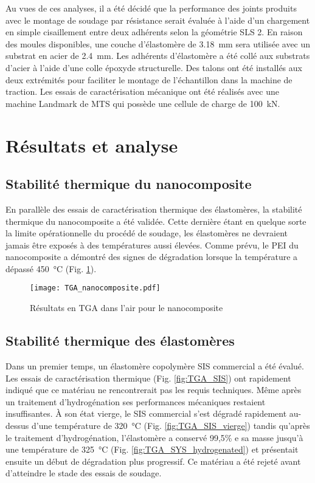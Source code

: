 Au vues de ces analyses, il a été décidé que la performance des joints produits avec le montage de soudage par résistance serait évaluée à l'aide d'un chargement en simple cisaillement entre deux adhérents selon la géométrie SLS 2. 
En raison des moules disponibles, une couche d'élastomère de \SI{3.18}{\milli\metre} sera utilisée avec un substrat en acier de \SI{2.4}{\milli\metre}. 
Les adhérents d'élastomère a été collé aux substrats d'acier à l'aide d'une colle époxyde structurelle. 
Des talons ont été installés aux deux extrémités pour faciliter le montage de l'échantillon dans la machine de traction. 
Les essais de caractérisation mécanique ont été réalisés avec une machine Landmark de MTS qui possède une cellule de charge de \SI{100}{\kilo\newton}. 

\FloatBarrier
\section{Résultats et analyse}

\subsection{Stabilité thermique du nanocomposite}

En parallèle des essais de caractérisation thermique des élastomères, la stabilité thermique du nanocomposite a été validée. 
Cette dernière étant en quelque sorte la limite opérationnelle du procédé de soudage, les élastomères ne devraient jamais être exposés à des températures aussi élevées. 
Comme prévu, le PEI du nanocomposite a démontré des signes de dégradation lorsque la température a dépassé \SI{450}{\celsius} (Fig. \ref{fig:TGA_nanocomposite}). 

\begin{figure}[htb]
	\centering
	\texttt{[image: TGA\_nanocomposite.pdf]}
	\caption{Résultats en TGA dans l'air pour le nanocomposite}
	\label{fig:TGA_nanocomposite}
\end{figure}

\FloatBarrier
\subsection{Stabilité thermique des élastomères}

Dans un premier temps, un élastomère copolymère SIS commercial a été évalué. 
Les essais de caractérisation thermique (Fig. \ref{fig:TGA_SIS}) ont rapidement indiqué que ce matériau ne rencontrerait pas les requis techniques. 
Même après un traitement d'hydrogénation ses performances mécaniques restaient insuffisantes. 
À son état vierge, le SIS commercial s'est dégradé rapidement au-dessus d'une température de \SI{320}{\celsius} (Fig. \ref{fig:TGA_SIS_vierge}) tandis qu'après le traitement d'hydrogénation, l'élastomère a conservé 99,5\% e sa masse jusqu'à une température de \SI{325}{\celsius} (Fig. \ref{fig:TGA_SYS_hydrogenated}) et présentait ensuite un début de dégradation plus progressif.  
Ce matériau a été rejeté avant d'atteindre le stade des essais de soudage. 

